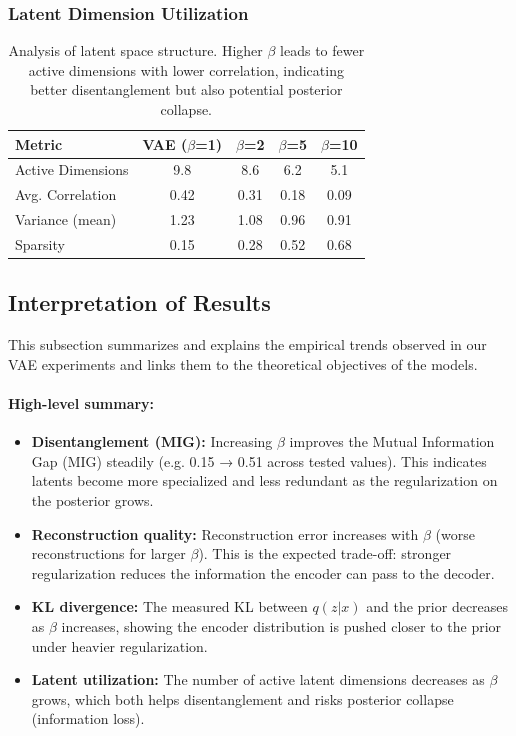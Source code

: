 \documentclass[conference]{IEEEtran}
\begin{document}
\subsubsection{Latent Dimension Utilization}

\begin{table}[H]
\centering
\begin{tabular}{@{}lcccc@{}}
\toprule
\textbf{Metric} & \textbf{VAE ($\beta$=1)} & \textbf{$\beta$=2} & \textbf{$\beta$=5} & \textbf{$\beta$=10} \\ \midrule
Active Dimensions & 9.8 & 8.6 & 6.2 & 5.1 \\
Avg. Correlation & 0.42 & 0.31 & 0.18 & 0.09 \\
Variance (mean) & 1.23 & 1.08 & 0.96 & 0.91 \\
Sparsity & 0.15 & 0.28 & 0.52 & 0.68 \\ \bottomrule
\end{tabular}
\caption{Analysis of latent space structure. Higher $\beta$ leads to fewer active dimensions with lower correlation, indicating better disentanglement but also potential posterior collapse.}
\label{tab:latent_analysis}
\end{table}

\subsection{Interpretation of Results}

This subsection summarizes and explains the empirical trends observed in our VAE experiments and links them to the theoretical objectives of the models.

\paragraph{High-level summary:}
\begin{itemize}
    \item \textbf{Disentanglement (MIG):} Increasing $\beta$ improves the Mutual Information Gap (MIG) steadily (e.g. 0.15 → 0.51 across tested values). This indicates latents become more specialized and less redundant as the regularization on the posterior grows.
    \item \textbf{Reconstruction quality:} Reconstruction error increases with $\beta$ (worse reconstructions for larger $\beta$). This is the expected trade-off: stronger regularization reduces the information the encoder can pass to the decoder.
    \item \textbf{KL divergence:} The measured KL between $q(z|x)$ and the prior decreases as $\beta$ increases, showing the encoder distribution is pushed closer to the prior under heavier regularization.
    \item \textbf{Latent utilization:} The number of active latent dimensions decreases as $\beta$ grows, which both helps disentanglement and risks posterior collapse (information loss).
\end{itemize}
\end{document}
